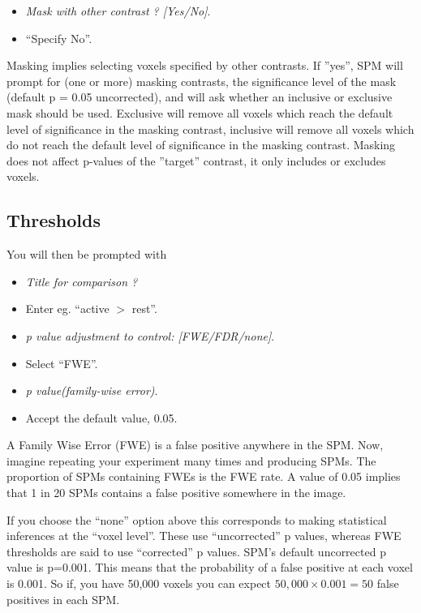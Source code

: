 \begin{itemize}
\item  \emph{Mask with other contrast ? [Yes/No]}.
\item ``Specify No''.
\end{itemize}

Masking implies selecting voxels specified by other contrasts. If ''yes'', SPM will prompt for (one or more) masking contrasts, the significance level of the mask (default p = 0.05 uncorrected), and will ask whether an inclusive or exclusive mask should be used. Exclusive will remove all voxels which reach the default level of significance in the masking contrast, inclusive will remove all voxels which do not reach the default level of significance in the masking contrast. Masking does not affect p-values of the ''target'' contrast, it only includes or excludes voxels.

\subsection{Thresholds}

You will then be prompted with

\begin{itemize}
\item \emph{Title for comparison ?}
\item Enter eg. ``active  $>$ rest''.
\item \emph{p value adjustment to control: [FWE/FDR/none]}.
\item Select ``FWE''.
\item \emph{p value(family-wise error)}.
\item Accept the default value, 0.05.
\end{itemize}

A Family Wise Error (FWE) is a false positive anywhere in the SPM. Now, imagine repeating your experiment many times and producing SPMs. The proportion of SPMs containing FWEs is the FWE rate. A value of 0.05 implies that 1 in 20 SPMs contains a false positive somewhere in the image. 

If you choose the ``none'' option above this corresponds to making statistical inferences at the ``voxel level''. These use ``uncorrected'' p values, whereas FWE thresholds are said to use ``corrected'' p values. SPM's default uncorrected p value is p=0.001. This means that the probability of a false positive at each voxel is 0.001. So if, you have 50,000 voxels you can expect $50,000 \times 0.001 = 50$ false positives in each SPM.

